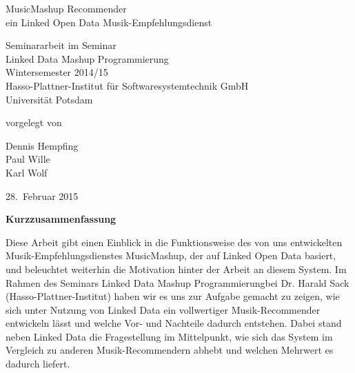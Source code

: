 \documentclass[11pt, a4paper]{article}
\begin{document}
          
\glsaddall
\begin{titlepage}
  \begin{center} 
    \mbox{}
    \vspace{1cm}
    
    {\huge MusicMashup Recommender \\[1em] {\LARGE ein Linked Open Data Musik-Empfehlungsdienst}}  
        
    \vspace{5cm}
    
    Seminararbeit im Seminar \\[1em]
    {\large \sc Linked Data Mashup Programmierung} \\[1em]
    Wintersemester 2014/15 \\[1em]
    Hasso-Plattner-Institut für Softwaresystemtechnik GmbH \\[1em]
    Universität Potsdam
    
    \vspace{4cm}
    
		vorgelegt von
		
    \vspace{1em}
    
        {\Large Dennis Hempfing} \\
		{\Large Paul Wille} \\
		{\Large Karl Wolf}
		
    \vspace{4em}
    
    28.~Februar 2015
  \end{center}
\end{titlepage}


\setcounter{page}{1}

\begin{center}
{\bf Kurzzusammenfassung} 
\end{center}

\noindent
Diese Arbeit gibt einen Einblick in die Funktionsweise des von uns entwickelten Musik-Empfehlungsdienstes MusicMashup, der auf Linked Open Data basiert, und beleuchtet weiterhin die Motivation hinter der Arbeit an diesem System. Im Rahmen des Seminars \glqq Linked Data Mashup Programmierung\grqq bei Dr. Harald Sack (Hasso-Plattner-Institut) haben wir es uns zur Aufgabe gemacht zu zeigen, wie sich unter Nutzung von Linked Data ein vollwertiger Musik-Recommender entwickeln lässt und welche Vor- und Nachteile dadurch entstehen.
Dabei stand neben Linked Data die Fragestellung im Mittelpunkt, wie sich das System im Vergleich zu anderen Musik-Recommendern abhebt und welchen Mehrwert es dadurch liefert.
\end{document}
